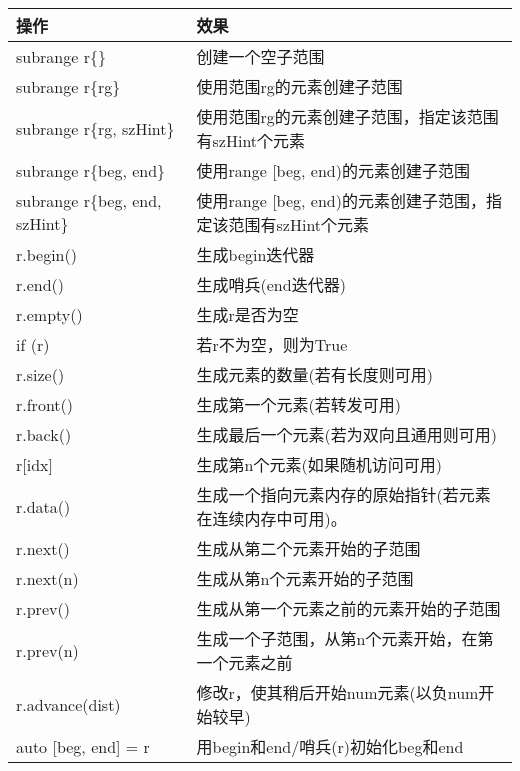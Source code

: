 \begin{longtable}[c]{|l|l|}
\hline
\textbf{操作}      & \textbf{效果}                                                           \\ \hline
\endfirsthead
%
\endhead
%
subrange r\{\}          & 创建一个空子范围                                                 \\ \hline
subrange r\{rg\}        & 使用范围rg的元素创建子范围                          \\ \hline
subrange r\{rg, szHint\}       & 使用范围rg的元素创建子范围，指定该范围有szHint个元素           \\ \hline
subrange r\{beg, end\}  & 使用range {[}beg, end)的元素创建子范围                \\ \hline
subrange r\{beg, end, szHint\} & 使用range {[}beg, end)的元素创建子范围，指定该范围有szHint个元素 \\ \hline
r.begin()               & 生成begin迭代器                                                 \\ \hline
r.end()                 & 生成哨兵(end迭代器)                                        \\ \hline
r.empty()               & 生成r是否为空                                                 \\ \hline
if (r)                  & 若r不为空，则为True                                                    \\ \hline
r.size()                & 生成元素的数量(若有长度则可用)                         \\ \hline
r.front()               & 生成第一个元素(若转发可用)                         \\ \hline
r.back()                & 生成最后一个元素(若为双向且通用则可用)           \\ \hline
r{[}idx{]}              & 生成第n个元素(如果随机访问可用)                      \\ \hline
r.data()                & 生成一个指向元素内存的原始指针(若元素在连续内存中可用)。       \\ \hline
r.next()                & 生成从第二个元素开始的子范围                        \\ \hline
r.next(n)               & 生成从第n个元素开始的子范围                          \\ \hline
r.prev()                & 生成从第一个元素之前的元素开始的子范围      \\ \hline
r.prev(n)               & 生成一个子范围，从第n个元素开始，在第一个元素之前 \\ \hline
r.advance(dist)         & 修改r，使其稍后开始num元素(以负num开始较早)                       \\ \hline
auto {[}beg, end{]} = r & 用begin和end/哨兵(r)初始化beg和end                  \\ \hline
\end{longtable}

